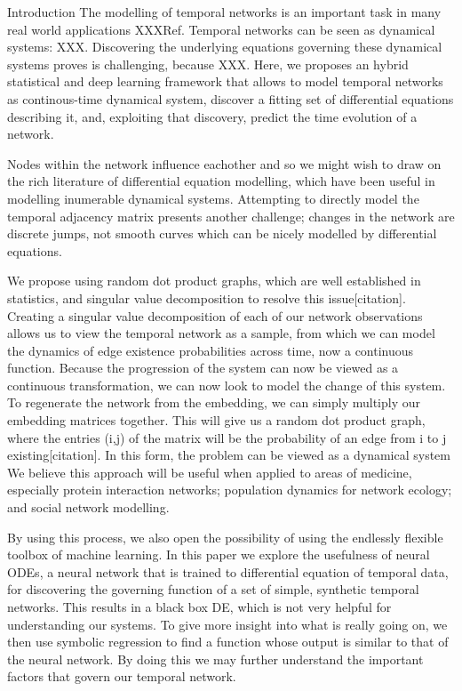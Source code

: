\documentclass{article}
\begin{document}
\begin{section}{Introduction}
The modelling of temporal networks is an important task in many real world applications XXXRef.
Temporal networks can be seen as dynamical systems: XXX.
Discovering the underlying equations governing these dynamical systems proves is challenging, because XXX.
Here, we proposes an hybrid statistical and deep learning framework that allows to model temporal networks as continous-time dynamical system, discover a fitting set of differential equations describing it, and, exploiting that discovery, predict the time evolution of a network.

Nodes within the network influence eachother and so we might wish to draw on the rich literature of differential equation modelling, which have been useful in modelling inumerable dynamical systems. Attempting to directly model the temporal adjacency matrix presents another challenge; changes in the network are discrete jumps, not smooth curves which can be nicely modelled by differential equations. 

We propose using random dot product graphs, which are well established in statistics, and singular value decomposition to resolve this issue[citation]. Creating a singular value decomposition of each of our network observations allows us to view the temporal network as a sample, from which we can model the dynamics of edge existence probabilities across time, now a continuous function. Because the progression of the system can now be viewed as a continuous transformation, we can now look to model the change of this system. To regenerate the network from the embedding, we can simply multiply our embedding matrices together. This will give us a random dot product graph, where the entries (i,j) of the matrix will be the probability of an edge from i to j existing[citation]. In this form, the problem can be viewed as a dynamical system We believe this approach will be useful when applied to areas of medicine, especially protein interaction networks; population dynamics for network ecology; and social network modelling. 

By using this process, we also open the possibility of using the endlessly flexible toolbox of machine learning. In this paper we explore the usefulness of neural ODEs, a neural network that is trained to differential equation of temporal data, for discovering the governing function of a set of simple, synthetic temporal networks. This results in a black box DE, which is not very helpful for understanding our systems. To give more insight into what is really going on, we then use symbolic regression to find a function whose output is similar to that of the neural network. By doing this we may further understand the important factors that govern our temporal network.

\end{section}
\end{document}
